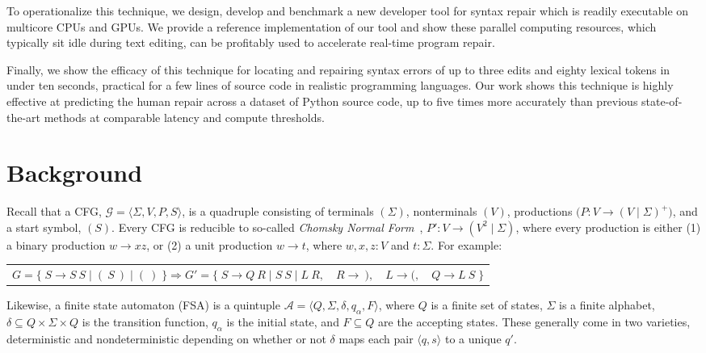 \documentclass[sigplan,acmsmall,nonacm,screen]{acmart}\settopmatter{printfolios=false,printccs=false,printacmref=false}
\begin{document}
To operationalize this technique, we design, develop and benchmark a new developer tool for syntax repair which is readily executable on multicore CPUs and GPUs. We provide a reference implementation of our tool and show these parallel computing resources, which typically sit idle during text editing, can be profitably used to accelerate real-time program repair.

Finally, we show the efficacy of this technique for locating and repairing syntax errors of up to three edits and eighty lexical tokens in under ten seconds, practical for a few lines of source code in realistic programming languages. Our work shows this technique is highly effective at predicting the human repair across a dataset of Python source code, up to five times more accurately than previous state-of-the-art methods at comparable latency and compute thresholds.

\section{Background}

Recall that a CFG, $\mathcal{G} = \langle \Sigma, V, P, S\rangle$, is a quadruple consisting of terminals $(\Sigma)$, nonterminals $(V)$, productions $\big(P\colon V \rightarrow (V \mid \Sigma)^+\big)$, and a start symbol, $(S)$. Every CFG is reducible to so-called \textit{Chomsky Normal Form}~\cite{chomsky1959certain}, $P'\colon V \rightarrow (V^2 \mid \Sigma)$, where every production is either (1) a binary production $w \rightarrow xz$, or (2) a unit production $w \rightarrow t$, where $w, x, z: V$ and $t: \Sigma$. For example:\vspace{-3pt}

\begin{table}[H]
  \begin{tabular}{llll}
    $G = \big\{\;S \rightarrow S\:S \mid (\:S\:) \mid (\:)\;\big\} \Longrightarrow G' = \big\{\;S\rightarrow Q\:R \mid S\:S \mid L\:R,$ & $R \rightarrow\:),$ & $L \rightarrow (,$ & $Q\rightarrow L\:S\;\big\}$
  \end{tabular}
\end{table}\vspace{-8pt}

Likewise, a finite state automaton (FSA) is a quintuple $\mathcal{A} = \langle Q, \Sigma, \delta, q_\alpha, F\rangle$, where $Q$ is a finite set of states, $\Sigma$ is a finite alphabet, $\delta \subseteq Q \times \Sigma \times Q$ is the transition function, $q_\alpha$ is the initial state, and $F \subseteq Q$ are the accepting states. These generally come in two varieties, deterministic and nondeterministic depending on whether or not $\delta$ maps each pair $\langle q, s \rangle$ to a unique $q'$.
\end{document}
